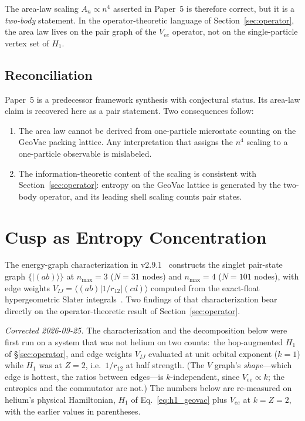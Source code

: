 \documentclass[twocolumn,pra,amsmath,amssymb,superscriptaddress]{revtex4-2}
\begin{document}
The area-law scaling $A_n \propto n^{4}$ asserted in Paper~5
is therefore correct, but it is a \emph{two-body} statement.  In
the operator-theoretic language of Section~\ref{sec:operator},
the area law lives on the pair graph of the $V_{ee}$ operator,
not on the single-particle vertex set of $H_1$.

\subsection{Reconciliation}

Paper~5 is a predecessor framework synthesis with conjectural
status.  Its area-law claim is recovered here as a
pair statement.  Two consequences follow:
\begin{enumerate}
  \item The area law cannot be derived from one-particle
    microstate counting on the GeoVac packing lattice.  Any
    interpretation that assigns the $n^{4}$ scaling to a
    one-particle observable is mislabeled.
  \item The information-theoretic content of the scaling is
    consistent with Section~\ref{sec:operator}: entropy on the
    GeoVac lattice is generated by the two-body operator, and
    its leading shell scaling counts pair states.
\end{enumerate}

\section{Cusp as Entropy Concentration}
\label{sec:cusp}

The energy-graph characterization in v2.9.1~\cite{EnergyGraph}
constructs the singlet pair-state graph
$\{\lvert(ab)\rangle\}$ at $n_{\max}=3$ ($N=31$ nodes) and
$n_{\max}=4$ ($N=101$ nodes), with edge weights
$V_{IJ} = \langle (ab)\lvert 1/r_{12}\rvert (cd)\rangle$
computed from the exact-float hypergeometric Slater
integrals~\cite{GeoVac_Paper7}.  Two findings of that
characterization bear directly on the operator-theoretic
result of Section~\ref{sec:operator}.

\emph{Corrected 2026-09-25.}  The characterization and the
decomposition below were first run on a system that was not helium on
two counts:\ the hop-augmented $H_1$ of \S\ref{sec:operator}, and edge
weights $V_{IJ}$ evaluated at unit orbital exponent ($k=1$) while $H_1$
was at $Z=2$, i.e.\ $1/r_{12}$ at half strength.  (The $V$ graph's
\emph{shape}---which edge is hottest, the ratios between edges---is
$k$-independent, since $V_{ee}\propto k$; the entropies and the
commutator are not.)  The numbers below are re-measured on helium's
physical Hamiltonian, $H_1$ of Eq.~\eqref{eq:h1_geovac} plus
$V_{ee}$ at $k=Z=2$, with the earlier values in parentheses.
\end{document}
